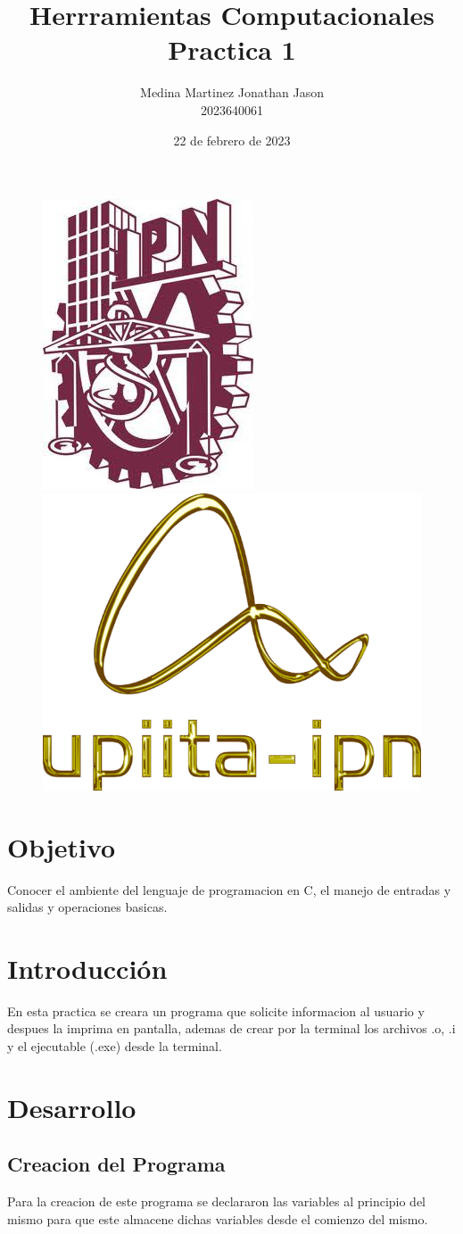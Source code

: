 \documentclass{article}
\title{Herrramientas Computacionales \\ Practica 1}
\author{Medina Martinez Jonathan Jason \\ 2023640061}
\date{22 de febrero de 2023}
\begin{document}

\fontsize{16}{18}\selectfont

\begin{figure}[t] %

\includegraphics[width=2.5 cm]{Logo1.jpeg}
\hfill
\includegraphics[width=3 cm]{Logo2.png}

\end{figure}

\maketitle %
\newpage

\tableofcontents %
\newpage

\section{Objetivo}

Conocer el ambiente del lenguaje de programacion en C, el manejo de entradas y salidas y operaciones basicas.
\section{Introducción}
En esta practica se creara un programa que solicite informacion al usuario y despues la imprima en pantalla, ademas de crear por la terminal los archivos .o, .i y el ejecutable (.exe) desde la terminal.
\newpage

\section{Desarrollo}
\subsection{Creacion del Programa}
Para la creacion de este programa se declararon las variables al principio del mismo para que este almacene dichas variables desde el comienzo del mismo.
\end{document}
